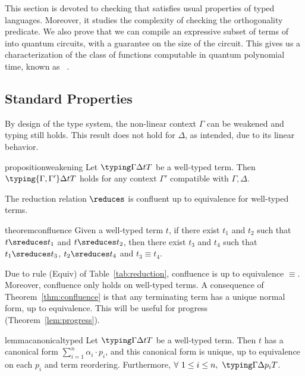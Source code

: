 This section is devoted to checking that {\hyrql} satisfies usual properties of
typed languages. Moreover, it studies the complexity of checking the
orthogonality predicate. We also prove that we can compile an expressive subset
of terms of \hyrql{} into quantum circuits, with a guarantee on the size of the
circuit. This gives us a characterization of the class of functions computable
in quantum polynomial time, known as \fbqp{}~\cite{BV97}.

\subsection{Standard Properties}
\label{subsec:properties}


By design of the type system, the non-linear context $\Gamma$ can be weakened
and typing still holds. This result does not hold for $\Delta$, as intended,
due to its linear behavior.

\begin{restatable}[Weakening]{proposition}{weakening}
  \label{lem:weakening}
  Let $\typing \Gamma \Delta t T$ be a well-typed term.
  Then $\typing {\Gamma, \Gamma'} \Delta t T$ holds for any context
  $\Gamma'$ compatible with $\Gamma, \Delta$.
\end{restatable}

The reduction relation $\reduces$ is confluent up to equivalence for
well-typed terms.

\begin{restatable}[Confluence]{theorem}{confluence}
  \label{thm:confluence}
  Given a well-typed term $t$, if there exist $t_1$ and $t_2$ such
  that $t \sreduces t_1$ and $t\sreduces t_2$,
  then there exist $t_3$ and $t_4$
  such that $t_1 \sreduces t_3$, $t_2 \sreduces t_4$ and $t_3 \equiv t_4$.
\end{restatable}
Due to rule (Equiv) of Table~\ref{tab:reduction}, confluence is up to
equivalence $\equiv$. Moreover, confluence only holds on well-typed terms.
A consequence of Theorem~\ref{thm:confluence} is that any terminating term has
a unique normal form, up to equivalence. This will be useful for progress
(Theorem~\ref{lem:progress}).

\begin{restatable}{lemma}{canonicaltyped}
  \label{lem:canonical-typed}
  Let $\typing \Gamma \Delta t T$ be a well-typed term.
  Then $t$ has a canonical form $\sum_{i=1}^n \alpha_i \cdot p_i$,
  and this canonical form is unique, up to equivalence on each $p_i$
  and term reordering. Furthermore, $\forall\ 1 \leq i \leq n,\ \typing \Gamma
  \Delta {p_i} T$.
\end{restatable}

